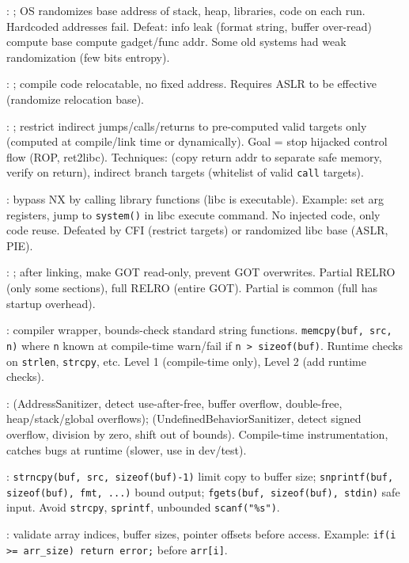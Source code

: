 : ; OS randomizes base address of stack, heap, libraries, code on each run. Hardcoded addresses fail. Defeat: info leak (format string, buffer over-read) \to compute base \to compute gadget/func addr. Some old systems had weak randomization (few bits entropy).

: ; compile code relocatable, no fixed address. Requires ASLR to be effective (randomize relocation base).

: ; restrict indirect jumps/calls/returns to pre-computed valid targets only (computed at compile/link time or dynamically). Goal = stop hijacked control flow (ROP, ret2libc). Techniques:  (copy return addr to separate safe memory, verify on return), indirect branch targets (whitelist of valid \texttt{call} targets).

: bypass NX by calling library functions (libc is executable). Example: set arg registers, jump to \texttt{system()} in libc \to execute command. No injected code, only code reuse. Defeated by CFI (restrict targets) or randomized libc base (ASLR, PIE).

: ; after linking, make GOT read-only, prevent GOT overwrites. Partial RELRO (only some sections), full RELRO (entire GOT). Partial is common (full has startup overhead).

: compiler wrapper, bounds-check standard string functions. \texttt{memcpy(buf, src, n)} where \texttt{n} known at compile-time \to warn/fail if \texttt{n > sizeof(buf)}. Runtime checks on \texttt{strlen}, \texttt{strcpy}, etc. Level 1 (compile-time only), Level 2 (add runtime checks).

:  (AddressSanitizer, detect use-after-free, buffer overflow, double-free, heap/stack/global overflows);  (UndefinedBehaviorSanitizer, detect signed overflow, division by zero, shift out of bounds). Compile-time instrumentation, catches bugs at runtime (slower, use in dev/test).

: \texttt{strncpy(buf, src, sizeof(buf)-1)} limit copy to buffer size; \texttt{snprintf(buf, sizeof(buf), fmt, ...)} bound output; \texttt{fgets(buf, sizeof(buf), stdin)} safe input. Avoid \texttt{strcpy}, \texttt{sprintf}, unbounded \texttt{scanf("\%s")}.

: validate array indices, buffer sizes, pointer offsets before access. Example: \texttt{if(i >= arr\_size) return error;} before \texttt{arr[i]}.

